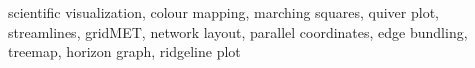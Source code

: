 \documentclass[conference]{IEEEtran}
\begin{document}
\begin{IEEEkeywords}
scientific visualization, colour mapping, marching squares, quiver plot, streamlines, gridMET, network layout, parallel
coordinates, edge bundling, treemap, horizon graph, ridgeline plot
\end{IEEEkeywords}











\appendices




\end{document}
